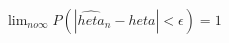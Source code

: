 \documentclass[preview]{standalone}
\begin{document}
\begin{center}
$\lim_{n 	o \infty} P(|\hat{	heta}_n - 	heta| < \epsilon) = 1$
\end{center}
\end{document}
